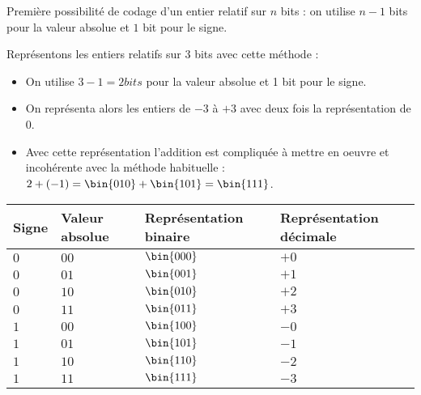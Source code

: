 Première possibilité de codage d'un entier relatif sur $n$ bits : on utilise $n-1$ bits pour la valeur absolue et
$1$ bit pour le signe.
\begin{exemple}

\begin{minipage}{0.45\textwidth}
Représentons les entiers relatifs sur 3 bits avec cette méthode :
\begin{itemize}
\item On utilise $3-1=2 bits$ pour la valeur absolue et 1 bit pour le signe.
\item On représenta alors les entiers de $-3$ à $+3$ avec deux fois la représentation de 0.
\item Avec cette représentation l'addition est compliquée à mettre en oeuvre et incohérente avec la méthode habituelle :  $2+(-1)=\bin{010}+\bin{101}=\bin{111}$.
\end{itemize} 
\end{minipage}
\begin{minipage}{0.45\textwidth}
\begin{tabular}{|p{}|p{}|p{}|p{}|}
\hline 
Signe & Valeur absolue & Représentation binaire & Représentation décimale \\ 
\hline 
$0$ & $00$ & $\bin{000}$ & $+0$ \\ 
$0$ & $01$ & $\bin{001}$ & $+1$ \\ 
$0$ & $10$ & $\bin{010}$ & $+2$ \\ 
$0$ & $11$ & $\bin{011}$ & $+3$ \\ 
$1$ & $00$ & $\bin{100}$ & $-0$ \\ 
$1$ & $01$ & $\bin{101}$ & $-1$ \\ 
$1$ & $10$ & $\bin{110}$ & $-2$ \\ 
$1$ & $11$ & $\bin{111}$ & $-3$ \\ 
\hline 
\end{tabular} 
\end{minipage}

\end{exemple}


